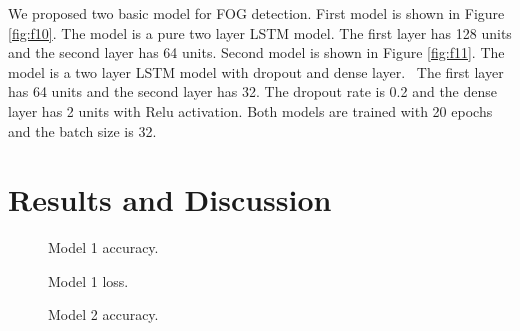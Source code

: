 \documentclass[10pt,twocolumn,letterpaper]{article}
\begin{document}
    We proposed two basic model for FOG detection. First model is shown in Figure \ref{fig:f10}. The model is a pure two layer LSTM model. The first layer has 128 units and the second layer has 64 units. Second model is shown in Figure \ref{fig:f11}. The model is a two layer LSTM model with dropout and dense layer.~\cite{10.1162/neco.1997.9.8.1735} The first layer has 64 units and the second layer has 32. The dropout rate is 0.2 and the dense layer has 2 units with Relu activation. Both models are trained with 20 epochs and the batch size is 32.

\section{Results and Discussion}
\label{sec:result}

\begin{figure}[t]
    \centering
    \caption{Model 1 accuracy.}
    \label{fig:f12}
\end{figure}

\begin{figure}[t]
    \centering
    \caption{Model 1 loss.}
    \label{fig:f13}
\end{figure}

\begin{figure}[t]
    \centering
    \caption{Model 2 accuracy.}
    \label{fig:f14}
\end{figure}
\end{document}
